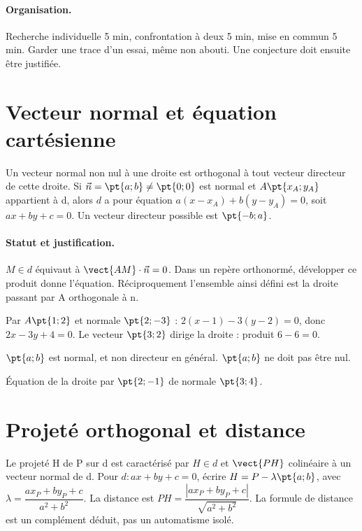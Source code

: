 \paragraph{Organisation.} Recherche individuelle 5 min, confrontation à deux 5 min, mise en commun 5 min. Garder une trace d’un essai, même non abouti. Une conjecture doit ensuite être justifiée.
\mxnewpage
\section{Vecteur normal et équation cartésienne}\label{C07-U1}
\begin{keypoint}
Un vecteur normal non nul à une droite est orthogonal à tout vecteur directeur de cette droite. Si $\vec n=\pt{a;b}\ne\pt{0;0}$ est normal et $A\pt{x_A;y_A}$ appartient à d, alors $d$ a pour équation $a(x-x_A)+b(y-y_A)=0$, soit $ax+by+c=0$. Un vecteur directeur possible est $\pt{-b;a}$.
\end{keypoint}
\paragraph{Statut et justification.} $M\in d$ équivaut à $\vect{AM}\cdot\vec n=0$. Dans un repère orthonormé, développer ce produit donne l’équation. Réciproquement l’ensemble ainsi défini est la droite passant par A orthogonale à n.
\begin{example}Par $A\pt{1;2}$ et normale $\pt{2;-3}$ : $2(x-1)-3(y-2)=0$, donc $2x-3y+4=0$. Le vecteur $\pt{3;2}$ dirige la droite : produit $6-6=0$.\end{example}\label{C07-EX1}
\begin{pitfall}$\pt{a;b}$ est normal, et non directeur en général. $\pt{a;b}$ ne doit pas être nul.\end{pitfall}
\begin{application}Équation de la droite par $\pt{2;-1}$ de normale $\pt{3;4}$.\end{application}\label{C07-AP1}
\section{Projeté orthogonal et distance}\label{C07-U2}
\begin{keypoint}
Le projeté H de P sur d est caractérisé par $H\in d$ et $\vect{PH}$ colinéaire à un vecteur normal de d. Pour $d:ax+by+c=0$, écrire $H=P-\lambda\pt{a;b}$, avec $\lambda =\dfrac{ax_P+by_P+c}{a^2+b^2}$. La distance est $PH=\dfrac{|ax_P+by_P+c|}{\sqrt {a^2+b^2}}$. La formule de distance est un complément déduit, pas un automatisme isolé.
\end{keypoint}
